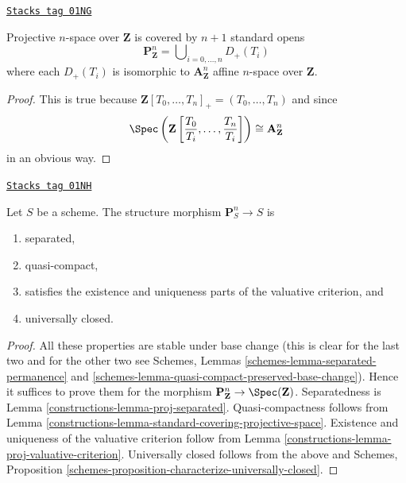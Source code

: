\begin{lemma}
\label{constructions-lemma-standard-covering-projective-space}
\href{https://stacks.math.columbia.edu/tag/01NG}{\texttt{Stacks tag 01NG}}

Projective $n$-space over $\mathbf{Z}$ is covered by
$n + 1$ standard opens
$$
\mathbf{P}^n_{\mathbf{Z}} =
\bigcup\nolimits_{i = 0, \ldots, n} D_{+}(T_i)
$$
where each $D_{+}(T_i)$ is isomorphic to $\mathbf{A}^n_{\mathbf{Z}}$
affine $n$-space over $\mathbf{Z}$.
\end{lemma}

\begin{proof}
This is true because
$\mathbf{Z}[T_0, \ldots, T_n]_{+} = (T_0, \ldots, T_n)$ and
since
$$
\Spec
\left(
\mathbf{Z}
\left[\frac{T_0}{T_i}, \ldots, \frac{T_n}{T_i}
\right]
\right)
\cong
\mathbf{A}^n_{\mathbf{Z}}
$$
in an obvious way.
\end{proof}

\begin{lemma}
\label{constructions-lemma-projective-space-separated}
\href{https://stacks.math.columbia.edu/tag/01NH}{\texttt{Stacks tag 01NH}}

Let $S$ be a scheme.
The structure morphism $\mathbf{P}^n_S \to S$ is
\begin{enumerate}
\item separated,
\item quasi-compact,
\item satisfies the existence and uniqueness parts of the valuative criterion,
and
\item universally closed.
\end{enumerate}
\end{lemma}

\begin{proof}

All these properties are stable under base change (this is clear for the
last two and for the other two see
Schemes, Lemmas
\ref{schemes-lemma-separated-permanence} and
\ref{schemes-lemma-quasi-compact-preserved-base-change}).
Hence it suffices to prove them for the morphism
$\mathbf{P}^n_{\mathbf{Z}} \to \Spec(\mathbf{Z})$.
Separatedness is Lemma \ref{constructions-lemma-proj-separated}. Quasi-compactness follows
from Lemma \ref{constructions-lemma-standard-covering-projective-space}.
Existence and uniqueness of the valuative criterion follow from
Lemma \ref{constructions-lemma-proj-valuative-criterion}.
Universally closed follows from the above and
Schemes, Proposition \ref{schemes-proposition-characterize-universally-closed}.
\end{proof}

